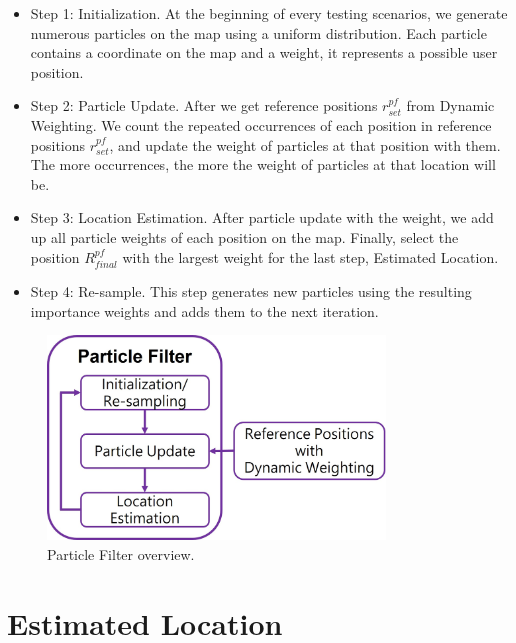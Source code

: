 \documentclass[a4paper,12pt]{report}
\begin{document}
\begin{itemize}
\item  Step 1: Initialization. At the beginning of every testing scenarios, we generate numerous particles on the map using a uniform distribution. Each particle contains a coordinate on the map and a weight, it represents a possible user position.
\item  Step 2: Particle Update. After we get reference positions $r_{set}^{pf}$ from Dynamic Weighting. We count the repeated occurrences of each position in reference positions $r_{set}^{pf}$, and update the weight of particles at that position with them. The more occurrences, the more the weight of particles at that location will be.
\item  Step 3: Location Estimation. After particle update with the weight, we add up all particle weights of each position on the map. Finally, select the position $R_{final}^{pf}$ with the largest weight for the last step, Estimated Location.
\item  Step 4: Re-sample. This step generates new particles using the resulting importance weights and adds them to the next iteration.
\end{itemize}
%

\begin{figure}[tbph]
    \begin{center}
    \includegraphics[width=0.8\textwidth]{images/3_5_Particle_Filter.jpg}
    \caption{Particle Filter overview.}
    \label{figure:3_5_Particle_Filter}
    \end{center}
\end{figure}

\section{Estimated Location}
\end{document}
